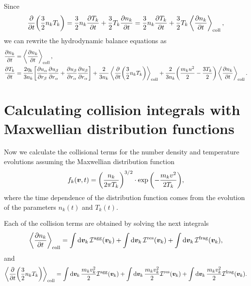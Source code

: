 \documentclass[aps,prl,preprint,groupedaddress,10pt]{revtex4-2}
\begin{document}
Since
\begin{equation}
    \pdv{t}\pqty{\frac{3}{2}n_kT_k}=\frac{3}{2}n_k\pdv{T_k}{t}+
    \frac{3}{2}T_k\pdv{n_k}{t}=\frac{3}{2}n_k\pdv{T_k}{t}+
    \frac{3}{2}T_k\ltx{\avg{\pdv{n_k}{t}}}{coll},
\end{equation}
we can rewrite the hydrodynamic balance equations as
\begin{equation}
    \begin{split}
        \pdv{n_k}{t} &= \ltx{\avg{\pdv{n_k}{t}}}{coll},\\
        \pdv{T_k}{t} &=
        \frac{2\eta_k}{3n_k}\bqty{\pdv{\ia{u}}{\ib{r}}\pdv{\ib{u}}{\ia{r}}+
            \pdv{\ib{u}}{\ia{r}}\pdv{\ib{u}}{\ia{r}}}+
        \frac{2}{3n_k}\ltx{\avg{\pdv{t}\pqty{\frac{3}{2}n_kT_k}}}{coll}+
        \frac{2}{3n_k}\pqty{\frac{m_ku^2}{2}-\frac{3T_k}{2}}\ltx{\avg{\pdv{n_k}{t}}}{coll}.
    \end{split}
\end{equation}

\section{Calculating collision integrals with Maxwellian distribution functions}
Now we calculate the collisional terms for the number density and temperature
evolutions assuming the Maxwellian distribution function
\begin{equation}
    f_k\pqty{\bv,t}=\pqty{\frac{n_k}{2\pi T_k}}^{3/2}\cdot
    \exp\pqty{-\frac{m_kv^2}{2T_k}},
\end{equation}
where the time dependence of the distribution function comes from the evolution
of the parameters $n_k(t)$ and $T_k(t)$.

Each of the collision terms are obtained by solving the next integrals
\begin{equation}
    \left\langle{\pdv{n_k}{t}}\right\rangle_{\mathrm{coll}} =
    \int\dd{\vb*{v}_k}\mathcal{I}^{\mathrm{agg}}(\vb*{v}_k)+
    \int\dd{\vb*{v}_k}\mathcal{I}^{\mathrm{res}}(\vb*{v}_k)+
    \int\dd{\vb*{v}_k}\mathcal{I}^{\mathrm{frag}}(\vb*{v}_k),
\end{equation}
and
\begin{equation}
    \ltx{\avg{\pdv{t}\pqty{\frac{3}{2}n_kT_k}}}{coll} =
    \int\dd{\bv_k}\frac{m_kv_k^2}{2}\utx{\mathcal{I}}{agg}(\bv_k)+
    \int\dd{\bv_k}\frac{m_kv_k^2}{2}\utx{\mathcal{I}}{res}(\bv_k)+
    \int\dd{\bv_k}\frac{m_kv_k^2}{2}\utx{\mathcal{I}}{frag}(\bv_k).
\end{equation}
\end{document}
